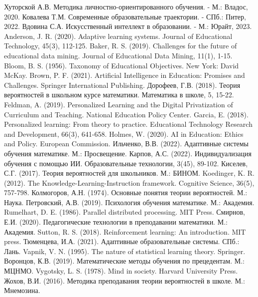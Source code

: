 \documentclass[a4paper,14pt]{extreport}
\begin{document}
\begin{thebibliography}{99}
 Хуторской А.В. Методика личностно-ориентированного обучения. - М.: Владос, 2020.
 Ковалева Т.М. Современные образовательные траектории. - СПб.: Питер, 2022.
 Вдовина С.А. Искусственный интеллект в образовании. - М.: Юрайт, 2023.
 Anderson, J. R. (2020). Adaptive learning systems. Journal of Educational Technology, 45(3), 112-125.
 Baker, R. S. (2019). Challenges for the future of educational data mining. Journal of Educational Data Mining, 11(1), 1-15.
 Bloom, B. S. (1956). Taxonomy of Educational Objectives. New York: David McKay.
 Brown, P. F. (2021). Artificial Intelligence in Education: Promises and Challenges. Springer International Publishing.
 Дорофеев, Г.В. (2018). Теория вероятностей в школьном курсе математики. Математика в школе, 5, 15-22.
 Feldman, A. (2019). Personalized Learning and the Digital Privatization of Curriculum and Teaching. National Education Policy Center.
 Garcia, E. (2018). Personalized learning: From theory to practice. Educational Technology Research and Development, 66(3), 641-658.
 Holmes, W. (2020). AI in Education: Ethics and Policy. European Commission.
 Ильченко, В.В. (2022). Адаптивные системы обучения математике. М.: Просвещение.
 Карпов, А.С. (2022). Индивидуализация обучения с помощью ИИ. Образовательные технологии, 3(45), 89-102.
 Киселев, С.Г. (2017). Теория вероятностей для школьников. М.: БИНОМ.
 Koedinger, K. R. (2012). The Knowledge-Learning-Instruction framework. Cognitive Science, 36(5), 757-798.
 Колмогоров, А.Н. (1974). Основные понятия теории вероятностей. М.: Наука.
 Петровский, А.В. (2019). Психология обучения математике. М.: Академия.
 Rumelhart, D. E. (1986). Parallel distributed processing. MIT Press.
 Смирнов, Е.И. (2020). Педагогические технологии в преподавании математики. М.: Академия.
 Sutton, R. S. (2018). Reinforcement learning: An introduction. MIT press.
 Тюменцева, И.А. (2021). Адаптивные образовательные системы. СПб.: Лань.
 Vapnik, V. N. (1995). The nature of statistical learning theory. Springer.
 Воронцов, К.В. (2019). Математические методы обучения по прецедентам. М.: МЦНМО.
 Vygotsky, L. S. (1978). Mind in society. Harvard University Press.
 Жохов, В.И. (2016). Методика преподавания теории вероятностей в школе. М.: Мнемозина.
\end{thebibliography}
\end{document}
